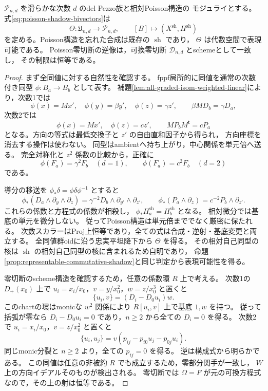 \begin{proposition}[Poisson模型への表現可能な射]
\label{prop:poisson-shadow-morphism}
$\mathcal P_{n,d}$ を滑らかな次数 $d$ のdel Pezzo族と相対Poisson構造の
モジュライとする。式\eqref{eq:poisson-shadow-bivectors}は
\[
 \Theta:\mathfrak U_{n,d}\longrightarrow\mathcal P_{n,d},
 \qquad [B]\longmapsto(X^{\mathrm{sh}},\Pi^{\mathrm{sh}})
\]
を定める。Poisson構造を忘れた合成は既存の $\operatorname{sh}$ であり，
$\Theta$ は代数空間で表現可能である。
Poisson零切断の逆像は，可換零切断 $\mathcal D_{n,d}$ とschemeとして一致し，
その制限は恒等である。
\end{proposition}
\begin{proof}
まず全同値に対する自然性を確認する。
fppf局所的に同値を通常の次数付き同型 $\phi:B_a\to B_b$ として表す。
補題\ref{lem:all-graded-isom-weighted-linear}により，次数1では
\[
 \phi(x)=Mx',\quad\phi(y)=\beta y',\quad\phi(z)=\gamma z',
 \qquad \beta M D_b=\gamma D_a,
\]
次数2では
\[
 \phi(x)=Mx',\quad\phi(z)=cz',\qquad MP_bM^{\mathsf t}=cP_a
\]
となる。方向の等式は最低交換子と $z'$ の自由直和因子から得られ，
方向座標を消去する操作は使わない。
同型はambientへ持ち上がり，中心関係を単元倍へ送る。
完全対称化と $z^2$ 係数の比較から，正確に
\[
 \phi(F_a)=\gamma^2F_b\quad(d=1),\qquad
 \phi(F_a)=c^2F_b\quad(d=2)
\]
である。

導分の移送を $\phi_*\delta=\phi\delta\phi^{-1}$ とすると
\[
 \phi_*(D_a\wedge\partial_y\wedge\partial_z)
   =\gamma^{-2}D_b\wedge\partial_{y'}\wedge\partial_{z'},
 \qquad
 \phi_*(P_a\wedge\partial_z)=c^{-2}P_b\wedge\partial_{z'}.
\]
これらの係数と方程式の係数が相殺し，
$\phi_*\Pi_a^{\mathrm{sh}}=\Pi_b^{\mathrm{sh}}$ となる。
相対微分では基底の単元を微分しない。
従ってPoisson構造は単元倍まででなく厳密に保たれる。
次数スカラーはProj上恒等であり，全ての式は合成・逆射・基底変更と両立する。
全同値群oidに沿う忠実平坦降下から $\Theta$ を得る。
その相対自己同型の核は $\operatorname{sh}$ の相対自己同型の核に含まれるため自明であり，
命題\ref{prop:representable-commutative-shadow}と同じ判定から表現可能性を得る。

零切断のscheme構造を確認するため，任意の係数環 $R$ 上で考える。
次数1の $D_+(x_0)$ 上で $u_i=x_i/x_0$，$v=y/x_0^2$，$w=z/x_0^3$ と置くと
\[
 \{u_i,v\}=(D_i-D_0u_i)w.
\]
このchartの環はmonicな $w^2$ 関係により $R[u_i,v]$ 上で基底 $1,w$ を持つ。
従って括弧が零なら $D_i-D_0u_i=0$ であり，$n\ge2$ から全ての $D_i=0$ を得る。
次数2で $u_i=x_i/x_0$，$v=z/x_0^2$ と置くと
\[
 \{u_i,u_j\}=v(p_{ij}-p_{i0}u_j-p_{0j}u_i).
\]
同じmonic分裂と $n\ge2$ より，全ての $p_{ij}=0$ を得る。
逆は構成式から明らかである。
この同値は任意の非被約 $R$ でも成立するため，零部分関手が一致し，
$W$ 上の方向イデアルそのものが検出される。
零切断では $\Omega=F$ が元の可換方程式なので，その上の射は恒等である。
\end{proof}

